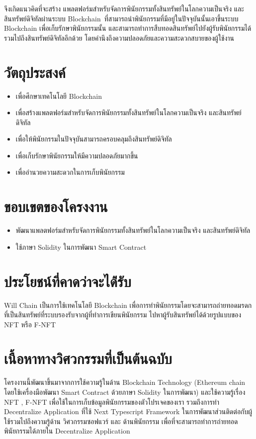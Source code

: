 \documentclass[12pt,oneside,openright,a4paper]{cpe-thai-project}
\begin{document}
\tab จึงเกิดแนวคิดที่จะสร้าง แพลตฟอร์มสำหรับจัดการพินัยกรรมทั้งสินทรัพย์ในโลกความเป็นจริง และสินทรัพย์ดิจิทัลผ่านระบบ Blockchain\ ที่สามารถนำพินัยกรรมที่มีอยู่ในปัจจุบันนั้นเอาขึ้นระบบ Blockchain เพื่อเก็บรักษาพินัยกรรมนั้น และสามารถทำการสืบทอดสินทรัพย์ไปยังผู้รับพินัยกรรมได้ รวมไปถึงสินทรัพย์ดิจิทัลอีกด้วย โดยคำนึงถึงความปลอดภัยและความสะดวกสบายของผู้ใช้งาน


\section{วัตถุประสงค์}

\begin{itemize}
\item เพื่อศึกษาเทคโนโลยี Blockchain
\item เพื่อสร้างแพลตฟอร์มสำหรับจัดการพินัยกรรมทั้งสินทรัพย์ในโลกความเป็นจริง และสินทรัพย์ดิจิทัล
\item เพื่อให้พินัยกรรมในปัจจุบันสามารถครอบคลุมถึงสินทรัพย์ดิจิทัล
\item เพื่อเก็บรักษาพินัยกรรมให้มีความปลอดภัยมากขึ้น
\item เพื่ออำนวยความสะดวกในการเก็บพินัยกรรม
\end{itemize}

\section{ขอบเขตของโครงงาน}

\begin{itemize}
\item พัฒนาแพลตฟอร์มสำหรับจัดการพินัยกรรมทั้งสินทรัพย์ในโลกความเป็นจริง และสินทรัพย์ดิจิทัล
\item ใช้ภาษา Solidity ในการพัฒนา Smart Contract
\end{itemize}

\section{ประโยชน์ที่คาดว่าจะได้่รับ}
\tab Will Chain เป็นการใช้เทคโนโลยี Blockchain เพื่อการทำพินัยกรรมโดยจะสามารถถ่ายทอดมรดกที่เป็นสินทรัพย์ที่ระบบรองรับจากผู้ที่ทำการเขียนพินัยกรรม ไปหาผู้รับสินทรัพย์ได้ด้วยรูปแบบของ NFT หรือ F-NFT
\section{เนื้อหาทางวิศวกรรมที่เป็นต้นฉบับ}
\tab โครงงานนี้พัฒนาขึ้นมาจากการใช้ความรู้ในด้าน Blockchain Technology (Ethereum chain โดยใช้เครื่องมือพัฒนา Smart Contract ด้วยภาษา Solidity ในการพัฒนา)  และใช้ความรู้เรื่อง NFT , F-NFT เพื่อใช้ในการเก็บข้อมูลพินัยกรรมของตัวโปรเจคของเรา รวมถึงการทำ Decentralize  Application ที่ใช้ Next Typescript Framework ในการพัฒนาส่วนติดต่อกับผู้ใช้รวมไปถึงความรู้ด้าน วิศวกรรมซอฟแวร์ และ ด้านพินัยกรรม เพื่อที่จะสามารถทำการถ่ายทอดพินัยกรรมได้ภายใน Decentralize  Application
\end{document}
